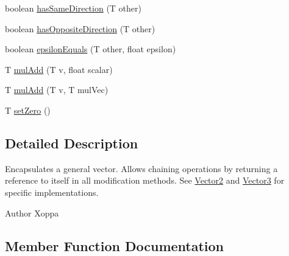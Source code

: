 \begin{DoxyCompactItemize}
\item 
boolean \hyperlink{interfaceairhockeyjava_1_1util_1_1_i_vector_a9a503c5b1c3d8132528f7cb9a59f5c95}{has\+Same\+Direction} (T other)
\item 
boolean \hyperlink{interfaceairhockeyjava_1_1util_1_1_i_vector_af1cb6853e5d05108ebced7acc8040b78}{has\+Opposite\+Direction} (T other)
\item 
boolean \hyperlink{interfaceairhockeyjava_1_1util_1_1_i_vector_af62a468191d5c43456ddf8d78f47aede}{epsilon\+Equals} (T other, float epsilon)
\item 
T \hyperlink{interfaceairhockeyjava_1_1util_1_1_i_vector_a77478e958370cbe13e100e00a70b049d}{mul\+Add} (T v, float scalar)
\item 
T \hyperlink{interfaceairhockeyjava_1_1util_1_1_i_vector_a8a2fa3256bd7c0164ab20c25546a6ced}{mul\+Add} (T v, T mul\+Vec)
\item 
T \hyperlink{interfaceairhockeyjava_1_1util_1_1_i_vector_afd99c154d35254a6a84894922f0df469}{set\+Zero} ()
\end{DoxyCompactItemize}


\subsection{Detailed Description}
Encapsulates a general vector. Allows chaining operations by returning a reference to itself in all modification methods. See \hyperlink{classairhockeyjava_1_1util_1_1_vector2}{Vector2} and \hyperlink{classairhockeyjava_1_1util_1_1_vector3}{Vector3} for specific implementations. \begin{DoxyAuthor}{Author}
Xoppa 
\end{DoxyAuthor}


\subsection{Member Function Documentation}
\hypertarget{interfaceairhockeyjava_1_1util_1_1_i_vector_a11b84dd4782255d27fa079ec1c7de8c1}{}
